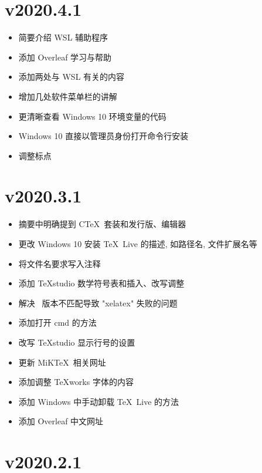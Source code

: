 \section*{v2020.4.1}

\begin{itemize}
  \item 简要介绍 WSL 辅助程序
  \item 添加 Overleaf 学习与帮助
  \item 添加两处与 WSL 有关的内容
  \item 增加几处软件菜单栏的讲解
  \item 更清晰查看 Windows 10 环境变量的代码
  \item Windows 10 直接以管理员身份打开命令行安装
  \item 调整标点
\end{itemize}

\section*{v2020.3.1}

\begin{itemize}
    \item 摘要中明确提到 C\TeX\ 套装和发行版、编辑器
    \item 更改 Windows 10 安装 \TeX\ Live 的描述, 如路径名, 文件扩展名等
    \item 将文件名要求写入注释
    \item 添加 \TeX studio 数学符号表和插入、改写调整
    \item 解决 \LaTeXe\ 版本不匹配导致 "xelatex" 失败的问题
    \item 添加打开 \textsf{cmd} 的方法
    \item 改写 \TeX studio 显示行号的设置
    \item 更新 MiK\TeX\ 相关网址
    \item 添加调整 \TeX works 字体的内容
    \item 添加 Windows 中手动卸载 \TeX\ Live 的方法
    \item 添加 Overleaf 中文网址
\end{itemize}

\section*{v2020.2.1}

